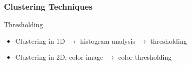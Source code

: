 \documentclass{beamer}
\begin{document}
\begin{frame}
\frametitle{Clustering Techniques}
\begin{block}{Thresholding}
\begin{itemize}
\item Clustering in 1D $\rightarrow$ histogram analysis $\rightarrow$ thresholding
\\
\item Clustering in 2D, color image $\rightarrow$ color thresholding
\end{itemize}
\end{block}
\end{frame}
\end{document}
